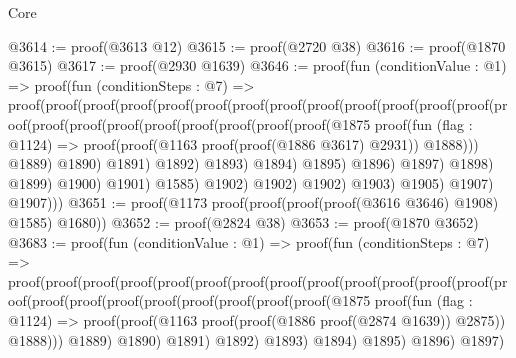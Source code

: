 \begin{lexlean}{Core}
\begin{coremodule}
@3614 := proof(@3613 @12)
@3615 := proof(@2720 @38)
@3616 := proof(@1870 @3615)
@3617 := proof(@2930 @1639)
@3646 := proof(fun (conditionValue : @1) =>
    proof(fun (conditionSteps : @7) =>
      proof(proof(proof(proof(proof(proof(proof(proof(proof(proof(proof(proof(proof(proof(proof(proof(proof(proof(proof(proof(proof(proof(@1875
                                                    proof(fun (flag : @1124) =>
                                                      proof(proof(@1163
                                                            proof(proof(@1886 @3617) @2931))
                                                          @1888)))
                                                  @1889)
                                                @1890)
                                              @1891)
                                            @1892)
                                          @1893)
                                        @1894)
                                      @1895)
                                    @1896)
                                  @1897)
                                @1898)
                              @1899)
                            @1900)
                          @1901)
                        @1585)
                      @1902)
                    @1902)
                  @1902)
                @1903)
              @1905)
            @1907)
          @1907)))
@3651 := proof(@1173 proof(proof(proof(proof(@3616 @3646) @1908) @1585) @1680))
@3652 := proof(@2824 @38)
@3653 := proof(@1870 @3652)
@3683 := proof(fun (conditionValue : @1) =>
    proof(fun (conditionSteps : @7) =>
      proof(proof(proof(proof(proof(proof(proof(proof(proof(proof(proof(proof(proof(proof(proof(proof(proof(proof(proof(proof(proof(proof(@1875
                                                    proof(fun (flag : @1124) =>
                                                      proof(proof(@1163
                                                            proof(proof(@1886 proof(@2874 @1639))
                                                                @2875))
                                                          @1888)))
                                                  @1889)
                                                @1890)
                                              @1891)
                                            @1892)
                                          @1893)
                                        @1894)
                                      @1895)
                                    @1896)
                                  @1897)

\end{coremodule}
\end{lexlean}
